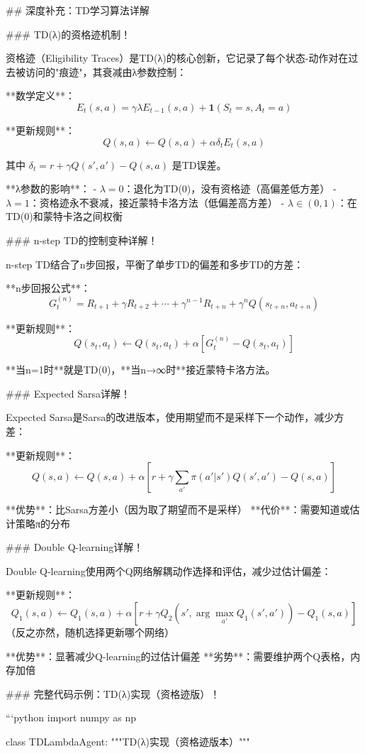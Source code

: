 ## 深度补充：TD学习算法详解

### TD(λ)的资格迹机制！

资格迹（Eligibility Traces）是TD(λ)的核心创新，它记录了每个状态-动作对在过去被访问的"痕迹"，其衰减由λ参数控制：

**数学定义**：
$$ E_t(s,a) = \gamma \lambda E_{t-1}(s,a) + \mathbf{1}(S_t=s, A_t=a) $$

**更新规则**：
$$ Q(s,a) \leftarrow Q(s,a) + \alpha \delta_t E_t(s,a) $$

其中 $\delta_t = r + \gamma Q(s',a') - Q(s,a)$ 是TD误差。

**λ参数的影响**：
- $\lambda=0$：退化为TD(0)，没有资格迹（高偏差低方差）
- $\lambda=1$：资格迹永不衰减，接近蒙特卡洛方法（低偏差高方差）  
- $\lambda \in (0,1)$：在TD(0)和蒙特卡洛之间权衡

### n-step TD的控制变种详解！

n-step TD结合了n步回报，平衡了单步TD的偏差和多步TD的方差：

**n步回报公式**：
$$ G_t^{(n)} = R_{t+1} + \gamma R_{t+2} + \cdots + \gamma^{n-1} R_{t+n} + \gamma^n Q(s_{t+n}, a_{t+n}) $$

**更新规则**：
$$ Q(s_t,a_t) \leftarrow Q(s_t,a_t) + \alpha \left[ G_t^{(n)} - Q(s_t,a_t) \right] $$

**当n=1时**就是TD(0)，**当n→∞时**接近蒙特卡洛方法。

### Expected Sarsa详解！

Expected Sarsa是Sarsa的改进版本，使用期望而不是采样下一个动作，减少方差：

**更新规则**：
$$ Q(s,a) \leftarrow Q(s,a) + \alpha \left[ r + \gamma \sum_{a'} \pi(a'|s') Q(s',a') - Q(s,a) \right] $$

**优势**：比Sarsa方差小（因为取了期望而不是采样）
**代价**：需要知道或估计策略π的分布

### Double Q-learning详解！

Double Q-learning使用两个Q网络解耦动作选择和评估，减少过估计偏差：

**更新规则**：
$$ Q_1(s,a) \leftarrow Q_1(s,a) + \alpha \left[ r + \gamma Q_2(s', \arg\max_{a'} Q_1(s',a')) - Q_1(s,a) \right] $$
（反之亦然，随机选择更新哪个网络）

**优势**：显著减少Q-learning的过估计偏差
**劣势**：需要维护两个Q表格，内存加倍

### 完整代码示例：TD(λ)实现（资格迹版）！

```python
import numpy as np

class TDLambdaAgent:
    """TD(λ)实现（资格迹版本）"""
    
